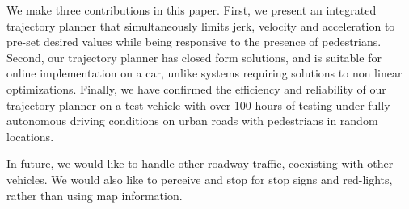 \documentclass[letterpaper, 10 pt, conference]{ieeeconf}  %
\begin{document}
We make three contributions in this paper. First, we present an integrated trajectory planner that
simultaneously limits jerk, velocity and acceleration to pre-set desired values while being responsive 
to the presence of pedestrians.
Second, our trajectory planner has closed form solutions, and is suitable for online implementation
on a car, unlike systems requiring solutions to non linear optimizations. Finally, we have confirmed the
efficiency and reliability of our trajectory planner on a test vehicle with over 100 hours of testing
under fully autonomous driving conditions on urban roads with pedestrians in random locations. 

In future, we would like to handle other roadway traffic, 
coexisting with other vehicles. We would also like to perceive and stop for stop signs and red-lights,
rather than using map information.





\end{document}
